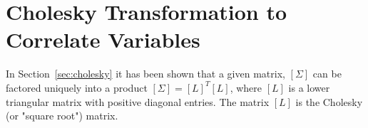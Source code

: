%	
%	
%	

\section{Cholesky Transformation to Correlate Variables}
In Section~\ref{sec:cholesky} it has been shown that a given matrix, $[\Sigma]$ can be factored uniquely into a product $[\Sigma]=[L]^T [L]$, where $[L]$ is a lower triangular matrix with positive diagonal entries. The matrix $[L]$ is the Cholesky (or "square root") matrix.

